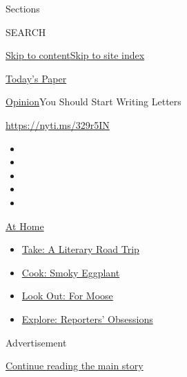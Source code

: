 Sections

SEARCH

\protect\hyperlink{site-content}{Skip to
content}\protect\hyperlink{site-index}{Skip to site index}

\href{https://myaccount.nytimes3xbfgragh.onion/auth/login?response_type=cookie\&client_id=vi}{}

\href{https://www.nytimes3xbfgragh.onion/section/todayspaper}{Today's
Paper}

\href{/section/opinion}{Opinion}\textbar{}You Should Start Writing
Letters

\url{https://nyti.ms/329r5IN}

\begin{itemize}
\item
\item
\item
\item
\item
\end{itemize}

\href{https://www.nytimes3xbfgragh.onion/spotlight/at-home?action=click\&pgtype=Article\&state=default\&region=TOP_BANNER\&context=at_home_menu}{At
Home}

\begin{itemize}
\tightlist
\item
  \href{https://www.nytimes3xbfgragh.onion/2020/07/28/books/time-for-a-literary-road-trip.html?action=click\&pgtype=Article\&state=default\&region=TOP_BANNER\&context=at_home_menu}{Take:
  A Literary Road Trip}
\item
  \href{https://www.nytimes3xbfgragh.onion/2020/07/29/magazine/bored-with-your-home-cooking-some-smoky-eggplant-will-fix-that.html?action=click\&pgtype=Article\&state=default\&region=TOP_BANNER\&context=at_home_menu}{Cook:
  Smoky Eggplant}
\item
  \href{https://www.nytimes3xbfgragh.onion/2020/07/27/travel/moose-michigan-isle-royale.html?action=click\&pgtype=Article\&state=default\&region=TOP_BANNER\&context=at_home_menu}{Look
  Out: For Moose}
\item
  \href{https://www.nytimes3xbfgragh.onion/interactive/2020/at-home/even-more-reporters-editors-diaries-lists-recommendations.html?action=click\&pgtype=Article\&state=default\&region=TOP_BANNER\&context=at_home_menu}{Explore:
  Reporters' Obsessions}
\end{itemize}

Advertisement

\protect\hyperlink{after-top}{Continue reading the main story}

